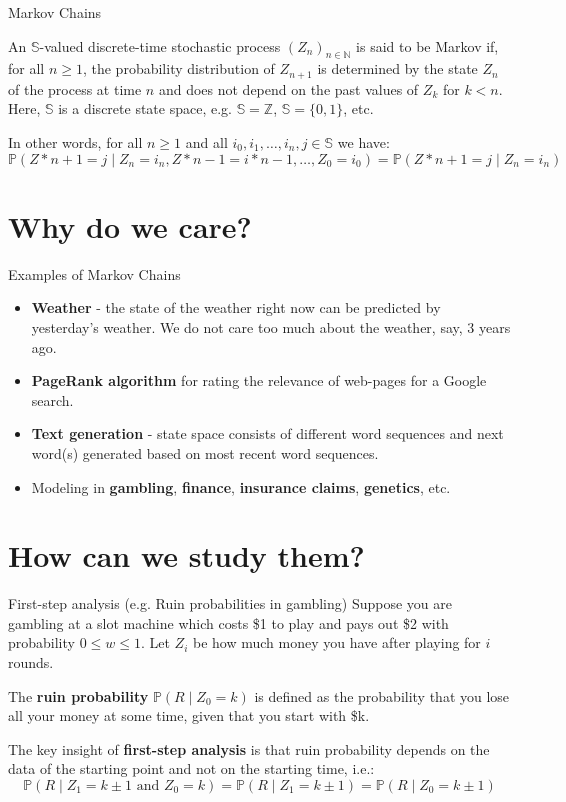 \documentclass{beamer}
\newcommand{\N}{\mathbb{N}}
\newcommand{\Z}{\mathbb{Z}}
\newcommand{\Pb}{\mathbb{P}}
\newcommand{\Ss}{\mathbb{S}}
\begin{document}
\begin{frame}{Markov Chains}
\begin{definition}
An $\Ss$-valued discrete-time stochastic process $(Z_n)_{n \in \N}$ is said to be Markov if, for all $n\geq 1$, the probability distribution of $Z_{n+1}$ is determined by the state $Z_n$ of the process at time $n$ and does not depend on the past values of $Z_k$ for $k<n$. Here, $\Ss$ is a discrete state space, e.g. $\Ss = \Z$, $\Ss = \{0,1\}$, etc.
\end{definition}
\vspace{0.25 in}
In other words, for all $n\geq 1$ and all $i_0, i_1, \dots, i_n, j \in \Ss$ we have:
$$ \Pb(Z*{n+1} = j \mid Z_n = i_n, Z*{n-1} = i*{n-1}, \dots, Z_0 = i_0) = \Pb(Z*{n+1} = j \mid Z_n = i_n)$$
\end{frame}
\section{Why do we care?}
\begin{frame}{Examples of Markov Chains}
\begin{itemize}
\item \textbf{Weather} - the state of the weather right now can be predicted by yesterday's weather. We do not care too much about the weather, say, 3 years ago.
\item \textbf{PageRank algorithm} for rating the relevance of web-pages for a Google search.
\item \textbf{Text generation} - state space consists of different word sequences and next word(s) generated based on most recent word sequences.
\item Modeling in \textbf{gambling}, \textbf{finance}, \textbf{insurance claims}, \textbf{genetics}, etc.
\end{itemize}

\end{frame}
\section{How can we study them?}
\begin{frame}{First-step analysis (e.g. Ruin probabilities in gambling)}
Suppose you are gambling at a slot machine which costs \$1 to play and pays out \$2 with probability $0\leq w\leq 1$. Let $Z_i$ be how much money you have after playing for $i$ rounds.
\newline

    The \textbf{ruin probability} $\Pb(R\mid Z_0 = k)$ is defined as the probability that you lose all your money at some time, given that you start with \$k.
    \newline

    The key insight of \textbf{first-step analysis} is that ruin probability depends on the data of the starting point and
    not on the starting time, i.e.:
    $$\Pb(R \mid Z_1 = k \pm 1 \text{ and } Z_0 = k) = \Pb(R \mid Z_1 = k \pm 1)
    = \Pb(R \mid Z_0 = k \pm 1)$$

\end{frame}
\end{document}
